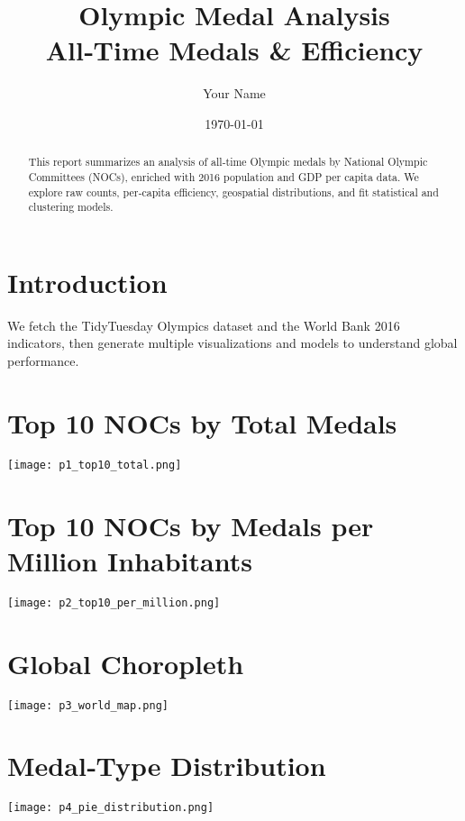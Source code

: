 \documentclass[11pt]{article}
\title{Olympic Medal Analysis\\\large All‐Time Medals \& Efficiency}
\author{Your Name}
\date{\today}
\begin{document}
\maketitle

\begin{abstract}
This report summarizes an analysis of all‐time Olympic medals by National Olympic Committees (NOCs), enriched with 2016 population and GDP per capita data. We explore raw counts, per‐capita efficiency, geospatial distributions, and fit statistical and clustering models.
\end{abstract}

\section{Introduction}
We fetch the TidyTuesday Olympics dataset and the World Bank 2016 indicators, then generate multiple visualizations and models to understand global performance.

\section{Top 10 NOCs by Total Medals}
\begin{center}
  \texttt{[image: p1\_top10\_total.png]}
\end{center}

\section{Top 10 NOCs by Medals per Million Inhabitants}
\begin{center}
  \texttt{[image: p2\_top10\_per\_million.png]}
\end{center}

\section{Global Choropleth}
\begin{center}
  \texttt{[image: p3\_world\_map.png]}
\end{center}

\section{Medal‐Type Distribution}
\begin{center}
  \texttt{[image: p4\_pie\_distribution.png]}
\end{center}
\end{document}
